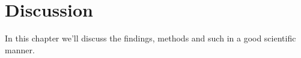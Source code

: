 \chapter{Discussion}
\label{chapter:discussion}

In this chapter we'll discuss the findings, methods and such in a good
scientific manner.
